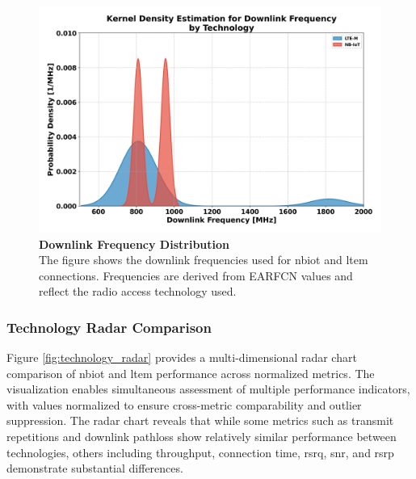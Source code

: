 \documentclass[12pt, english, openany]{book}
\begin{document}
\begin{figure}[htbp]
    \centering
    \includegraphics[width=1.0\textwidth]{downlink_frequency_frequency_kde.png}
    \caption{\textbf{Downlink Frequency Distribution} \\ The figure shows the downlink frequencies used for \gls{nbiot} and \gls{ltem} connections. Frequencies are derived from EARFCN values and reflect the radio access technology used.}
    \label{fig:downlink_frequency}
\end{figure}
\FloatBarrier
\subsubsection*{Technology Radar Comparison} \label{sec:technology_radar_comparison}

Figure \ref{fig:technology_radar} provides a multi-dimensional radar chart comparison of \gls{nbiot} and \gls{ltem} performance across normalized metrics. The visualization enables simultaneous assessment of multiple performance indicators, with values normalized to ensure cross-metric comparability and outlier suppression. The radar chart reveals that while some metrics such as transmit repetitions and downlink pathloss show relatively similar performance between technologies, others including throughput, connection time, \gls{rsrq}, \gls{snr}, and \gls{rsrp} demonstrate substantial differences.
\end{document}
